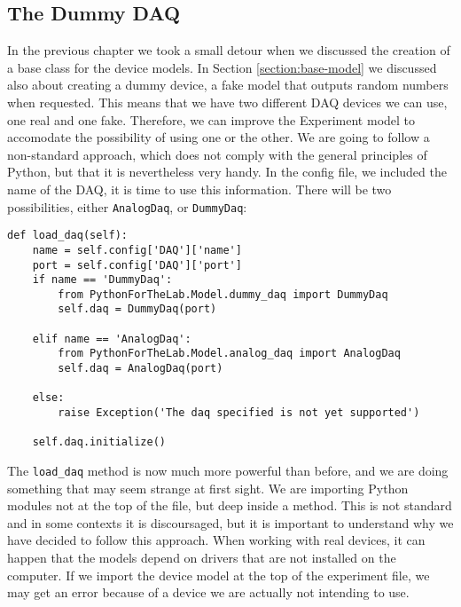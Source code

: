 
\subsection{The Dummy DAQ}\label{subsection:loading-dummy-daq}
In the previous chapter we took a small detour when we discussed the creation of a base class for the device models. In Section \ref{section:base-model} we discussed also about creating a dummy device, a fake model that outputs random numbers when requested. This means that we have two different DAQ devices we can use, one real and one fake. Therefore, we can improve the Experiment model to accomodate the possibility of using one or the other. We are going to follow a non-standard approach, which does not comply with the general principles of Python, but that it is nevertheless very handy. In the config file, we included the name of the DAQ, it is time to use this information. There will be two possibilities, either \texttt{AnalogDaq}, or \texttt{DummyDaq}:

\begin{verbatim}
def load_daq(self):
    name = self.config['DAQ']['name']
    port = self.config['DAQ']['port']
    if name == 'DummyDaq':
        from PythonForTheLab.Model.dummy_daq import DummyDaq
        self.daq = DummyDaq(port)
        
    elif name == 'AnalogDaq':
        from PythonForTheLab.Model.analog_daq import AnalogDaq
        self.daq = AnalogDaq(port)
        
    else:
        raise Exception('The daq specified is not yet supported')
    
    self.daq.initialize()
\end{verbatim}

The \texttt{load\_daq} method is now much more powerful than before, and we are doing something that may seem strange at first sight. We are importing Python modules not at the top of the file, but deep inside a method. This is not standard and in some contexts it is discoursaged, but it is important to understand why we have decided to follow this approach. When working with real devices, it can happen that the models depend on drivers that are not installed on the computer. If we import the device model at the top of the experiment file, we may get an error because of a device we are actually not intending to use. 

